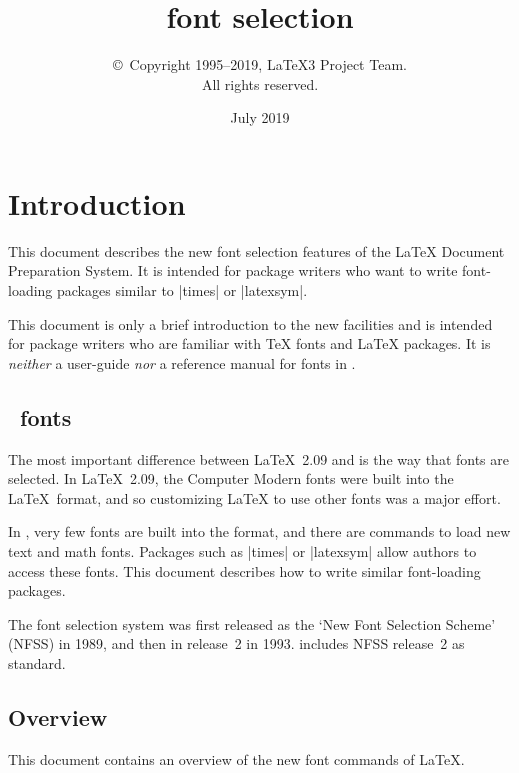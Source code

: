 \documentclass{ltxguide}[1995/11/28]
\title{\LaTeXe{} font selection}
\author{\copyright~Copyright 1995--2019, \LaTeX3 Project Team.\\
   All rights reserved.}
\date{July 2019}
\begin{document}
 
\maketitle
 
\tableofcontents
 
\section{Introduction}
 
This document describes the new font selection features of the \LaTeX{}
Document Preparation System.  It is intended for package writers who
want to write font-loading packages similar to |times| or |latexsym|.

This document is only a brief introduction to the new facilities and
is intended for package writers who are familiar with \TeX{} fonts and
\LaTeX{} packages.  It is \emph{neither} a user-guide \emph{nor} a
reference manual for fonts in \LaTeXe.
 
\subsection{\LaTeXe~fonts}
 
The most important difference between \LaTeX~2.09 and \LaTeXe{} is the
way that fonts are selected.  In \LaTeX~2.09, the Computer Modern fonts
were built into the \LaTeX~format, and so customizing \LaTeX{} to use
other fonts was a major effort.
 
In \LaTeXe, very few fonts are built into the format, and there are
commands to load new text and math fonts.  Packages such as |times| or
|latexsym| allow authors to access these fonts.
This document describes how to write similar font-loading packages.
 
The \LaTeXe{} font selection system was first released as the `New Font
Selection Scheme' (NFSS) in 1989, and then in release~2 in 1993.
\LaTeXe{} includes NFSS release~2 as standard.
 
\subsection{Overview}
 
This document contains an overview of the new font commands
of \LaTeX.
 
\end{document}
